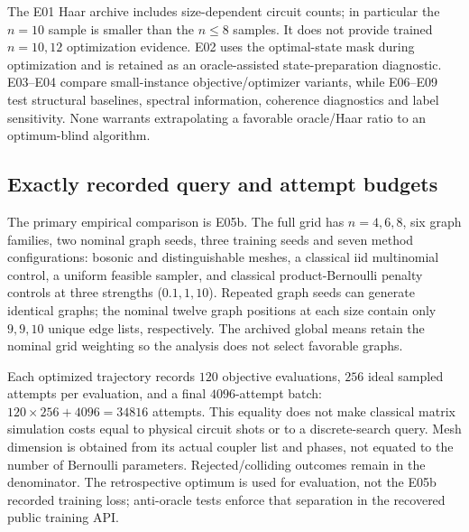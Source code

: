The E01 Haar archive includes size-dependent circuit counts; in particular the $n=10$ sample is smaller than the $n\le8$ samples. It does not provide trained $n=10,12$ optimization evidence. E02 uses the optimal-state mask during optimization and is retained as an oracle-assisted state-preparation diagnostic. E03--E04 compare small-instance objective/optimizer variants, while E06--E09 test structural baselines, spectral information, coherence diagnostics and label sensitivity. None warrants extrapolating a favorable oracle/Haar ratio to an optimum-blind algorithm.

\subsection{Exactly recorded query and attempt budgets}
The primary empirical comparison is E05b. The full grid has $n=4,6,8$, six graph families, two nominal graph seeds, three training seeds and seven method configurations: bosonic and distinguishable meshes, a classical iid multinomial control, a uniform feasible sampler, and classical product-Bernoulli penalty controls at three strengths ($0.1,1,10$). Repeated graph seeds can generate identical graphs; the nominal twelve graph positions at each size contain only $9,9,10$ unique edge lists, respectively. The archived global means retain the nominal grid weighting so the analysis does not select favorable graphs.

Each optimized trajectory records $120$ objective evaluations, $256$ ideal sampled attempts per evaluation, and a final $4096$-attempt batch: $120\times256+4096=34816$ attempts. This equality does not make classical matrix simulation costs equal to physical circuit shots or to a discrete-search query. Mesh dimension is obtained from its actual coupler list and phases, not equated to the number of Bernoulli parameters. Rejected/colliding outcomes remain in the denominator. The retrospective optimum is used for evaluation, not the E05b recorded training loss; anti-oracle tests enforce that separation in the recovered public training API.

